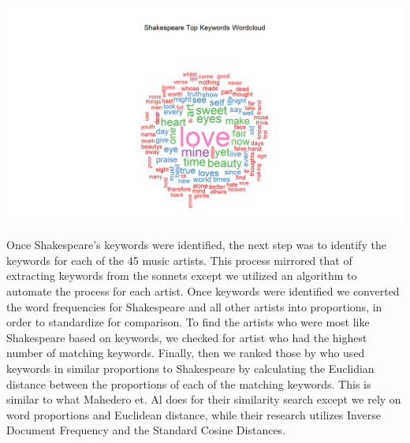 \documentclass[10pt,a4paper]{article}
\begin{document}
\begin{center}
\includegraphics[width=14cm]{_assets/Shakespeare_Keywords_WordCloud.png}
\end{center}

\noindent Once Shakespeare’s keywords were identified, the next step was to identify the keywords for each of the 45 music artists. This process mirrored that of extracting keywords from the sonnets except we utilized an algorithm to automate the process for each artist. Once keywords were identified we converted the word frequencies for Shakespeare and all other artists into proportions, in order to standardize for comparison. To find the artists who were most like Shakespeare based on keywords, we checked for artist who had the highest number of matching keywords. Finally, then we ranked those by who used keywords in similar proportions to Shakespeare by calculating the Euclidian distance between the proportions of each of the matching keywords. This is similar to what Mahedero et. Al \cite{NLP-for-lyrics} does for their similarity search except we rely on word proportions and Euclidean distance, while their research utilizes Inverse Document Frequency and the Standard Cosine Distances. 
\end{document}
